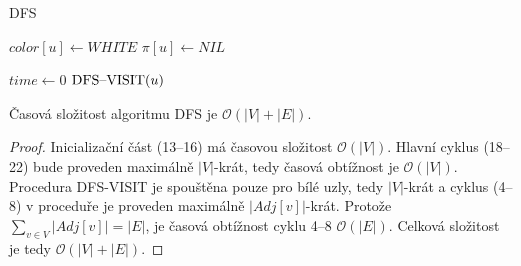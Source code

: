         \begin{algorithm}
            \DontPrintSemicolon
            \caption{DFS}
            \vspace*{0.5em}

            \vspace*{0.5em}

            {
                $color[u] \leftarrow \textit{WHITE}$\;
                $\pi[u] \leftarrow \textit{NIL}$\;
            }
            \vspace*{0.5em}

            $time \leftarrow 0$\;
            {
                {
                    $\textnormal{DFS--VISIT}(u)$\;
                }
            }
            \vspace*{0.5em}


        \end{algorithm}

        \newpage

        \begin{theorem}
            Časová složitost algoritmu DFS je $\mathcal{O}(|V| + |E|)$.
        \end{theorem}

        \begin{proof}
            Inicializační část (13--16) má časovou složitost $\mathcal{O}(|V|)$. Hlavní cyklus (18--22) bude proveden maximálně $|V|$-krát, tedy časová obtížnost je $\mathcal{O}(|V|)$. Procedura DFS-VISIT je spouštěna pouze pro bílé uzly, tedy $|V|$-krát a cyklus (4--8) v proceduře je proveden maximálně $|Adj[v]|$-krát. Protože $\sum_{v \in V}|Adj[v]| = |E|$, je časová obtížnost cyklu 4--8 $\mathcal{O}(|E|)$. Celková složitost je tedy $\mathcal{O}(|V| + |E|)$.
        \end{proof}

